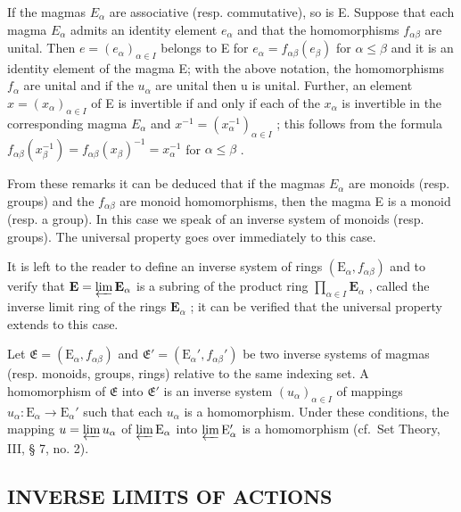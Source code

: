 If the magmas \(E_{\alpha}\) are associative (resp. commutative), so is E. Suppose that each magma \(E_{\alpha}\) admits an identity element \(e_{\alpha}\) and that the homomorphisms \(f_{\alpha\beta}\) are unital. Then \(e = (e_{\alpha})_{\alpha \in I}\) belongs to E for \(e_{\alpha} = f_{\alpha\beta}(e_{\beta})\) for \(\alpha \leqslant \beta\) and it is an identity element of the magma E; with the above notation, the homomorphisms \(f_{\alpha}\) are unital and if the \(u_{\alpha}\) are unital then u is unital. Further, an element \(x = (x_{\alpha})_{\alpha \in I}\) of E is invertible if and only if each of the \(x_{\alpha}\) is invertible in the corresponding magma \(E_{\alpha}\) and \(x^{-1} = (x_{\alpha}^{-1})_{\alpha \in I}\) ; this follows from the formula \(f_{\alpha\beta}(x_{\beta}^{-1}) = f_{\alpha\beta}(x_{\beta})^{-1} = x_{\alpha}^{-1}\) for \(\alpha \leqslant \beta\) .

From these remarks it can be deduced that if the magmas \(E_{\alpha}\) are monoids (resp. groups) and the \(f_{\alpha\beta}\) are monoid homomorphisms, then the magma E is a monoid (resp. a group). In this case we speak of an inverse system of monoids (resp. groups). The universal property goes over immediately to this case.

It is left to the reader to define an inverse system of rings \((\mathrm{E}_{\alpha}, f_{\alpha \beta})\) and to verify that \(\mathbf{E} = \varprojlim \mathbf{E}_{\alpha}\) is a subring of the product ring \(\prod_{\alpha \in I} \mathbf{E}_{\alpha}\) , called the inverse limit ring of the rings \(\mathbf{E}_{\alpha}\) ; it can be verified that the universal property extends to this case.

Let \(\mathfrak{E} = (\mathrm{E}_{\alpha}, f_{\alpha\beta})\) and \(\mathfrak{E}' = (\mathrm{E}_{\alpha}', f_{\alpha\beta}')\) be two inverse systems of magmas (resp. monoids, groups, rings) relative to the same indexing set. A homomorphism of \(\mathfrak{E}\) into \(\mathfrak{E}'\) is an inverse system \((u_{\alpha})_{\alpha \in I}\) of mappings \(u_{\alpha}: \mathrm{E}_{\alpha} \to \mathrm{E}_{\alpha}'\) such that each \(u_{\alpha}\) is a homomorphism. Under these conditions, the mapping \(u = \varprojlim u_{\alpha}\) of \(\varprojlim \mathrm{E}_{\alpha}\) into \(\varprojlim \mathrm{E}_{\alpha}'\) is a homomorphism (cf.~Set Theory, III, § 7, no. 2).

\subsection{INVERSE LIMITS OF ACTIONS}

